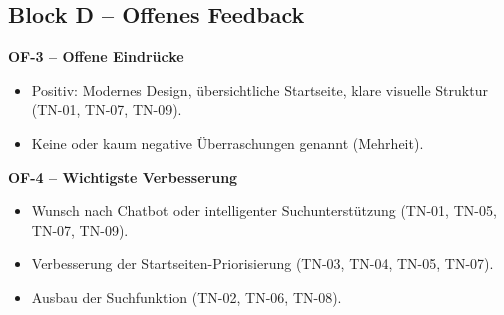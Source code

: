 \subsection{Block D -- Offenes Feedback}

\textbf{OF-3 -- Offene Eindrücke}

\begin{itemize}
  \item Positiv: Modernes Design, übersichtliche Startseite, klare visuelle Struktur (TN-01, TN-07, TN-09).
  \item Keine oder kaum negative Überraschungen genannt (Mehrheit).
\end{itemize}

\vspace{2em}
\textbf{OF-4 -- Wichtigste Verbesserung}

\begin{itemize}
  \item Wunsch nach Chatbot oder intelligenter Suchunterstützung (TN-01, TN-05, TN-07, TN-09).
  \item Verbesserung der Startseiten-Priorisierung (TN-03, TN-04, TN-05, TN-07).
  \item Ausbau der Suchfunktion (TN-02, TN-06, TN-08).
\end{itemize}

\newpage
